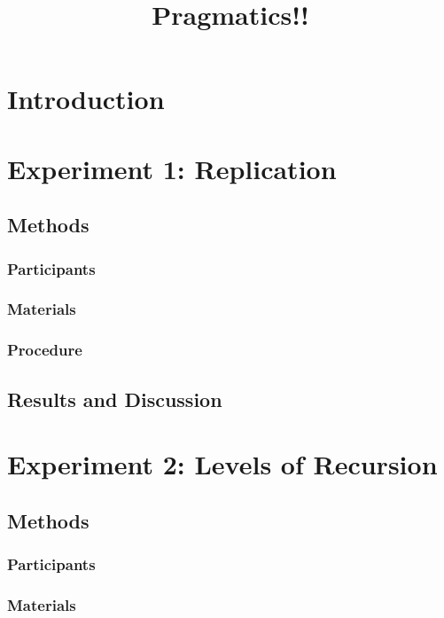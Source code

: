 \documentclass[man,noapacite]{apa2}
\title{Pragmatics!!}
\begin{document}
\maketitle                            


\section{Introduction}

\section{Experiment 1: Replication}

\subsection{Methods}

\subsubsection{Participants}
\subsubsection{Materials}
\subsubsection{Procedure}

\subsection{Results and Discussion}

\section{Experiment 2: Levels of Recursion}

\subsection{Methods}

\subsubsection{Participants}
\subsubsection{Materials}
\end{document}
